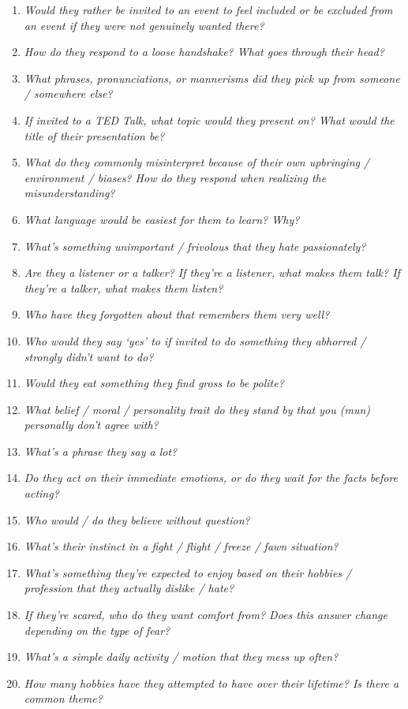 \begin{enumerate}
    \item\textit{Would they rather be invited to an event to feel included or be excluded from an event if they were not genuinely wanted there?}
    \item\textit{How do they respond to a loose handshake? What goes through their head?}
    \item\textit{What phrases, pronunciations, or mannerisms did they pick up from someone / somewhere else?}
    \item\textit{If invited to a TED Talk, what topic would they present on? What would the title of their presentation be?}
    \item\textit{What do they commonly misinterpret because of their own upbringing / environment / biases? How do they respond when realizing the misunderstanding?}
    \item\textit{What language would be easiest for them to learn? Why?}
    \item\textit{What’s something unimportant / frivolous that they hate passionately?}
    \item\textit{Are they a listener or a talker? If they’re a listener, what makes them talk? If they’re a talker, what makes them listen?}
    \item\textit{Who have they forgotten about that remembers them very well?}
    \item\textit{Who would they say ‘yes’ to if invited to do something they abhorred / strongly didn’t want to do?}
    \item\textit{Would they eat something they find gross to be polite?}
    \item\textit{What belief / moral / personality trait do they stand by that you (mun) personally don’t agree with?}
    \item\textit{What’s a phrase they say a lot?}
    \item\textit{Do they act on their immediate emotions, or do they wait for the facts before acting?}
    \item\textit{Who would / do they believe without question?}
    \item\textit{What’s their instinct in a fight / flight / freeze / fawn situation?}
    \item\textit{What’s something they’re expected to enjoy based on their hobbies / profession that they actually dislike / hate?}
    \item\textit{If they’re scared, who do they want comfort from? Does this answer change depending on the type of fear?}
    \item\textit{What’s a simple daily activity / motion that they mess up often?}
    \item\textit{How many hobbies have they attempted to have over their lifetime? Is there a common theme?}
  \end{enumerate}
